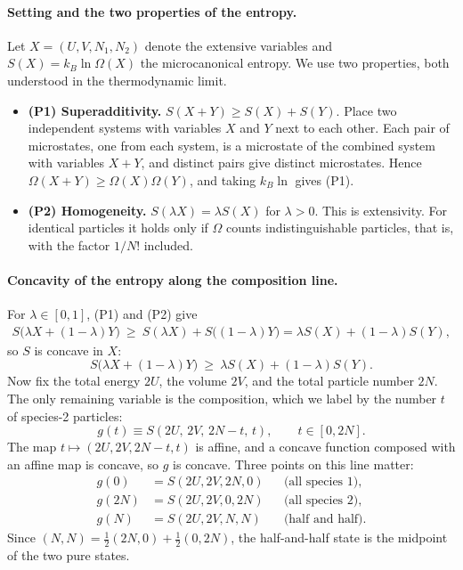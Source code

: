 \paragraph{Setting and the two properties of the entropy.}
Let $X=(U,V,N_1,N_2)$ denote the extensive variables and
$S(X)=k_B\ln\Omega(X)$ the microcanonical entropy. We use
two properties, both understood in the thermodynamic limit.
\begin{itemize}
    \item \textbf{(P1) Superadditivity.} $S(X+Y)\ge S(X)+S(Y)$.
    Place two independent systems with variables $X$ and $Y$ next to each
    other. Each pair of microstates, one from each system, is a microstate of
    the combined system with variables $X+Y$, and distinct pairs give
    distinct microstates. Hence $\Omega(X+Y)\ge\Omega(X)\Omega(Y)$, and taking
    $k_B\ln$ gives (P1).
    \item \textbf{(P2) Homogeneity.} $S(\lambda X)=\lambda S(X)$ for
    $\lambda>0$. This is extensivity. For identical particles it holds only
    if $\Omega$ counts indistinguishable particles, that is, with the factor
    $1/N!$ included.
\end{itemize}

\paragraph{Concavity of the entropy along the composition line.}
For $\lambda\in[0,1]$, (P1) and (P2) give
\begin{align*}
    S\big(\lambda X+(1-\lambda)Y\big)
    \ \ge\ S(\lambda X)+S\big((1-\lambda)Y\big)
    = \lambda S(X)+(1-\lambda)S(Y),
\end{align*}
so $S$ is concave in $X$:
\begin{equation}
    \boxed{S\big(\lambda X+(1-\lambda)Y\big)\ \ge\ \lambda S(X)+(1-\lambda)S(Y).}
\end{equation}
Now fix the total energy $2U$, the volume $2V$, and the total particle number
$2N$. The only remaining variable is the composition, which we label by the
number $t$ of species-2 particles:
\begin{equation*}
    g(t)\equiv S(2U,\,2V,\,2N-t,\,t),\qquad t\in[0,2N].
\end{equation*}
The map $t\mapsto(2U,2V,2N-t,t)$ is affine, and a concave function composed
with an affine map is concave, so $g$ is concave. Three points on this line
matter:
\begin{align*}
    g(0)&=S(2U,2V,2N,0) &&\text{(all species 1)},\\
    g(2N)&=S(2U,2V,0,2N) &&\text{(all species 2)},\\
    g(N)&=S(2U,2V,N,N) &&\text{(half and half)}.
\end{align*}
Since $(N,N)=\tfrac12(2N,0)+\tfrac12(0,2N)$, the half-and-half state is the
midpoint of the two pure states.

